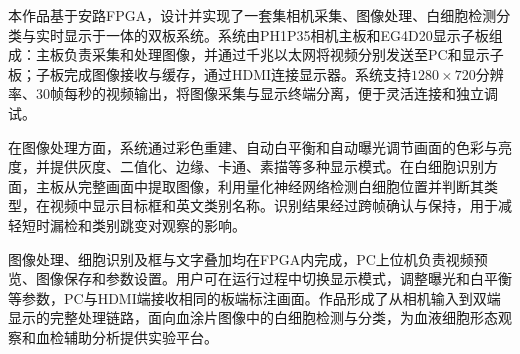 \documentclass[UTF8,fontset=fandol,zihao=-4]{ctexart}
\begin{document}
\abstractheading
本作品基于安路FPGA，设计并实现了一套集相机采集、图像处理、白细胞检测分类与实时显示于一体的双板系统。系统由PH1P35相机主板和EG4D20显示子板组成：主板负责采集和处理图像，并通过千兆以太网将视频分别发送至PC和显示子板；子板完成图像接收与缓存，通过HDMI连接显示器。系统支持$1280\times720$分辨率、30帧每秒的视频输出，将图像采集与显示终端分离，便于灵活连接和独立调试。

在图像处理方面，系统通过彩色重建、自动白平衡和自动曝光调节画面的色彩与亮度，并提供灰度、二值化、边缘、卡通、素描等多种显示模式。在白细胞识别方面，主板从完整画面中提取图像，利用量化神经网络检测白细胞位置并判断其类型，在视频中显示目标框和英文类别名称。识别结果经过跨帧确认与保持，用于减轻短时漏检和类别跳变对观察的影响。

图像处理、细胞识别及框与文字叠加均在FPGA内完成，PC上位机负责视频预览、图像保存和参数设置。用户可在运行过程中切换显示模式，调整曝光和白平衡等参数，PC与HDMI端接收相同的板端标注画面。作品形成了从相机输入到双端显示的完整处理链路，面向血涂片图像中的白细胞检测与分类，为血液细胞形态观察和血检辅助分析提供实验平台。






\end{document}
